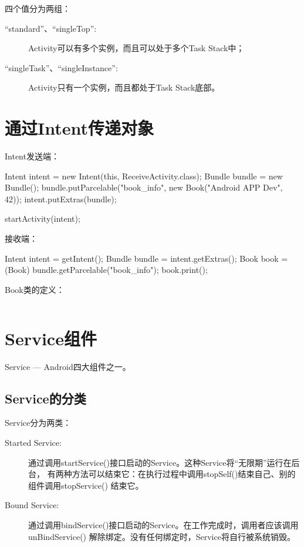 ﻿\documentclass[a4paper,11pt]{article}
\begin{document}
  四个值分为两组：

  \begin{description}
    \item[``standard''、``singleTop'':] Activity可以有多个实例，而且可以处于多个Task Stack中；
    \item[``singleTask''、``singleInstance'':] Activity只有一个实例，而且都处于Task Stack底部。
  \end{description}


  \section[通过Intent传递对象]{通过Intent传递对象}
  Intent发送端：\par
  \begin{javacode}
Intent intent = new Intent(this, ReceiveActivity.class);
Bundle bundle = new Bundle();
bundle.putParcelable("book_info", new Book("Android APP Dev", 42));
intent.putExtras(bundle);

startActivity(intent);
  \end{javacode}

  接收端：\par
  \begin{javacode}
Intent intent = getIntent();
Bundle bundle = intent.getExtras();
Book book = (Book) bundle.getParcelable("book_info");
book.print();
  \end{javacode}

  Book类的定义：\par
  \inputminted[linenos,tabsize=4,bgcolor=srcbg]{java}{ParcableBook.java}


  \section[Service组件]{Service组件}
  Service --- Android四大组件之一。

  \subsection[Service的分类]{Service的分类}
  Service分为两类：\par
  \begin{description}
    \item[Started Service:] 通过调用startService()接口启动的Service。这种Service将“无限期”运行在后台，
                            有两种方法可以结束它：在执行过程中调用stopSelf()结束自己、别的组件调用stopService() 结束它。
    \item[Bound Service:] 通过调用bindService()接口启动的Service。在工作完成时，调用者应该调用unBindService()
                          解除绑定。没有任何绑定时，Service将自行被系统销毁。
  \end{description}
\end{document}
